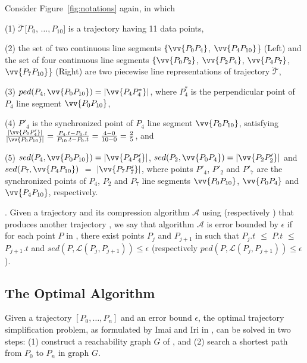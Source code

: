 \begin{example}
\label{exm-notations}
Consider Figure~\ref{fig:notations} again, in which

\sstab(1) $\dddot{\mathcal{T}}[P_0$, $\ldots, P_{10}]$ is a trajectory having 11 data points,

\sstab(2) the set of two continuous line segments $\{\vv{P_0P_4}$, $\vv{P_4P_{10}}$\} (Left) and the set of four continuous line segments $\{\vv{P_0P_2}$, $\vv{P_2P_4}$, $\vv{P_4P_7}$, $\vv{P_7P_{10}}$\} (Right) are two piecewise line representations of trajectory $\dddot{\mathcal{T}}$,

\sstab(3) $ped(P_4, \vv{P_0P_{10}})=|\vv{P_4P^*_4}|$, where $P^*_4$ is the perpendicular point of $P_4$ \wrt line segment $\vv{P_0P_{10}}$,

\sstab(4) $P'_4$ is the synchronized point of $P_4$ \wrt line segment $\vv{P_0P_{10}}$, satisfying $\frac{|\vv{P_0P'_4}|}{|\vv{P_0P_{10}}|} = \frac{P_4.t - P_0.t}{P_{10}.t-P_0.t} = \frac{4-0}{10-0}= \frac{2}{5}$, and

\sstab(5) $sed(P_4, \vv{P_0P_{10}})= |\vv{P_4P'_4}|$, $sed(P_2, \vv{P_0P_{4}})= |\vv{P_2P'_2}|$ and $sed(P_7, \vv{P_4P_{10}})$ $=$ $|\vv{P_7P'_7}|$,
where points $P'_4$, $P'_2$ and $P'_7$ are the synchronized points of $P_4$, $P_2$ and $P_7$ \wrt line segments $\vv{P_0P_{10}}$, $\vv{P_0P_{4}}$ and $\vv{P_4P_{10}}$, respectively. \eop
\end{example}

. Given a trajectory  and its compression  algorithm $\mathcal{A}$ using \sed (respectively \ped) that produces another trajectory ,
we say that algorithm $\mathcal{A}$ is error bounded by $\epsilon$ if  for each point $P$ in , there exist points $P_j$ and $P_{j+1}$ in  such that $P_j.t$ $\le$ $P.t$ $\le$ $P_{j+1}.t$ and $sed(P, \mathcal{L}(P_j,P_{j+1}))\le \epsilon$ (respectively $ped(P, \mathcal{L}(P_j,P_{j+1}))\le \epsilon$).



\subsection{The Optimal \lsa Algorithm}
\label{subsec-optimal}

Given a trajectory ${[P_0, \ldots, P_n]}$ and an error bound $\epsilon$, the optimal trajectory simplification problem, as formulated by Imai and Iri in \cite{Imai:Optimal}, can be solved in two steps: (1) construct a reachability graph $G$ of , and (2) search a shortest path from $P_0$ to $P_{n}$ in graph $G$.

